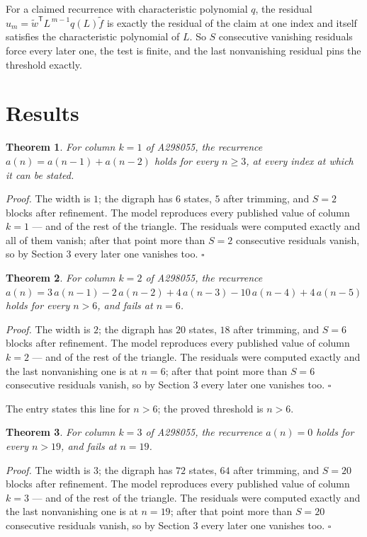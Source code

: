 \documentclass[11pt]{article}
\newtheorem{theorem}{Theorem}
\theoremstyle{definition}
\begin{document}
For a claimed recurrence with characteristic polynomial $q$, the residual $u_m = \tilde w^{\mathsf T}L^{\,m-1}q(L)\tilde f$ is exactly the residual of the claim at one index and itself satisfies the characteristic polynomial of $L$. So $S$ consecutive vanishing residuals force every later one, the test is finite, and the last nonvanishing residual pins the threshold exactly.

\section{Results}

\begin{theorem} For column $k = 1$ of A298055, the recurrence $a(n) = a(n-1) + a(n-2)$ holds for every $n \ge 3$, at every index at which it can be stated.\end{theorem}

{\itshape Proof.} The width is $1$; the digraph has $6$ states, $5$ after trimming, and $S = 2$ blocks after refinement. The model reproduces every published value of column $k = 1$ --- and of the rest of the triangle. The residuals were computed exactly and all of them vanish; after that point more than $S = 2$ consecutive residuals vanish, so by Section 3 every later one vanishes too. $\square$

\begin{theorem} For column $k = 2$ of A298055, the recurrence $a(n) = 3\,a(n-1) - 2\,a(n-2) + 4\,a(n-3) - 10\,a(n-4) + 4\,a(n-5)$ holds for every $n > 6$, and fails at $n = 6$.\end{theorem}

{\itshape Proof.} The width is $2$; the digraph has $20$ states, $18$ after trimming, and $S = 6$ blocks after refinement. The model reproduces every published value of column $k = 2$ --- and of the rest of the triangle. The residuals were computed exactly and the last nonvanishing one is at $n = 6$; after that point more than $S = 6$ consecutive residuals vanish, so by Section 3 every later one vanishes too. $\square$

The entry states this line for $n > 6$; the proved threshold is $n > 6$.

\begin{theorem} For column $k = 3$ of A298055, the recurrence $a(n) = 0$ holds for every $n > 19$, and fails at $n = 19$.\end{theorem}

{\itshape Proof.} The width is $3$; the digraph has $72$ states, $64$ after trimming, and $S = 20$ blocks after refinement. The model reproduces every published value of column $k = 3$ --- and of the rest of the triangle. The residuals were computed exactly and the last nonvanishing one is at $n = 19$; after that point more than $S = 20$ consecutive residuals vanish, so by Section 3 every later one vanishes too. $\square$
\end{document}
